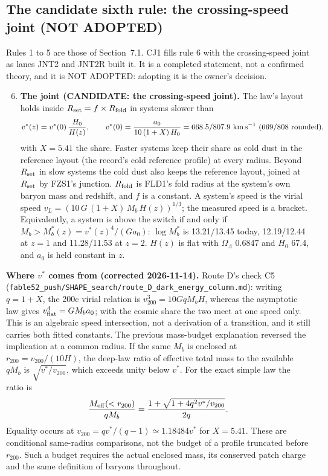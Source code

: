 \documentclass[10pt]{article}
\begin{document}
\subsection{The candidate sixth rule: the crossing-speed joint (NOT ADOPTED)}
Rules 1 to 5 are those of Section~7.1. CJ1 fills rule 6 with the crossing-speed joint as lanes JNT2 and JNT2R built it. It is a completed statement, not a confirmed theory, and it is NOT ADOPTED: adopting it is the owner's decision.
\begin{enumerate}
\setcounter{enumi}{5}
\item \textbf{The joint (CANDIDATE: the crossing-speed joint).} The law's layout holds inside $R_{\rm set}=f\times R_{\rm fold}$ in systems slower than
\[ v^*(z)=v^*(0)\,\frac{H_0}{H(z)},\qquad v^*(0)=\frac{a_0}{10\,(1+X)\,H_0}=668.5/807.9\ {\rm km\,s^{-1}}\ (669/808\ \text{rounded}), \]
with $X=5.41$ the share. Faster systems keep their share as cold dust in the reference layout (the record's cold reference profile) at every radius. Beyond $R_{\rm set}$ in slow systems the cold dust also keeps the reference layout, joined at $R_{\rm set}$ by FZS1's junction. $R_{\rm fold}$ is FLD1's fold radius at the system's own baryon mass and redshift, and $f$ is a constant. A system's speed is the virial speed $v_L=(10\,G\,(1+X)\,M_b\,H(z))^{1/3}$; the measured speed is a bracket. Equivalently, a system is above the switch if and only if $M_b>M_b^*(z)=v^*(z)^4/(G a_0)$: $\log M_b^*$ is 13.21/13.45 today, 12.19/12.44 at $z=1$ and 11.28/11.53 at $z=2$. $H(z)$ is flat with $\Omega_\Lambda$ 0.6847 and $H_0$ 67.4, and $a_0$ is held constant in $z$.
\end{enumerate}
\textbf{Where $v^*$ comes from (corrected 2026-11-14).} Route D's check C5 (\texttt{fable52\_push/SHAPE\_search/route\_D\_dark\_energy\_column.md}): writing $q=1+X$, the 200c virial relation is $v_{200}^3=10GqM_bH$, whereas the asymptotic law gives $v_{\rm flat}^4=GM_ba_0$; with the cosmic share the two meet at one speed only. This is an algebraic speed intersection, not a derivation of a transition, and it still carries both fitted constants. The previous mass-budget explanation reversed the implication at a common radius. If the same $M_b$ is enclosed at $r_{200}=v_{200}/(10H)$, the deep-law ratio of effective total mass to the available $qM_b$ is $\sqrt{v^*/v_{200}}$, which exceeds unity below $v^*$. For the exact simple law the ratio is
\[
 \frac{M_{\rm eff}(<r_{200})}{qM_b}=\frac{1+\sqrt{1+4q^2v^*/v_{200}}}{2q}.
\]
Equality occurs at $v_{200}=qv^*/(q-1)\simeq1.18484v^*$ for $X=5.41$. These are conditional same-radius comparisons, not the budget of a profile truncated before $r_{200}$. Such a budget requires the actual enclosed mass, its conserved patch charge and the same definition of baryons throughout.
\end{document}
